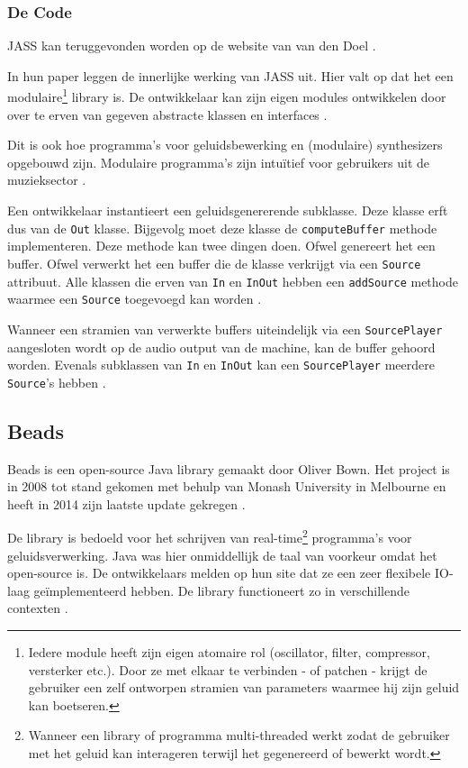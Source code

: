 \subsubsection*{De Code}
\label{sec:jass_code}

JASS kan teruggevonden worden op de website van van den Doel \autocite{jasscode}.

In hun paper leggen \textcite{jass} de innerlijke werking van JASS uit. Hier valt op dat het een modulaire\footnote{Iedere module heeft zijn eigen atomaire rol (oscillator, filter, compressor, versterker etc.). Door ze met elkaar te verbinden - of patchen - krijgt de gebruiker een zelf ontworpen stramien van parameters waarmee hij zijn geluid kan boetseren.} library is. De ontwikkelaar kan zijn eigen modules ontwikkelen door over te erven van gegeven abstracte klassen en interfaces  \autocite{jass}. 

Dit is ook hoe programma's voor geluidsbewerking en (modulaire) synthesizers opgebouwd zijn. Modulaire programma's zijn intuïtief voor gebruikers uit de muzieksector \autocite{bartvincent}.

Een ontwikkelaar instantieert een geluidsgenererende subklasse. Deze klasse erft dus van de \verb+Out+ klasse. Bijgevolg moet deze klasse de \verb+computeBuffer+ methode implementeren. Deze methode kan twee dingen doen. Ofwel genereert het een buffer. Ofwel verwerkt het een buffer die de klasse verkrijgt via een \verb+Source+ attribuut. Alle klassen die erven van \verb+In+ en \verb+InOut+ hebben een \verb+addSource+ methode waarmee een \verb+Source+ toegevoegd kan worden \autocite{jass}.

Wanneer een stramien van verwerkte buffers uiteindelijk via een \verb+SourcePlayer+ aangesloten wordt op de audio output van de machine, kan de buffer gehoord worden. Evenals subklassen van \verb+In+ en \verb+InOut+ kan een \verb+SourcePlayer+ meerdere \verb+Source+'s hebben \autocite{jass}.

\subsection{Beads}

Beads is een open-source Java library gemaakt door Oliver Bown. Het project is in 2008 tot stand gekomen met behulp van Monash University in Melbourne en heeft in 2014 zijn laatste update gekregen \autocite{beads}.

De library is bedoeld voor het schrijven van real-time\footnote{Wanneer een library of programma multi-threaded werkt zodat de gebruiker met het geluid kan interageren terwijl het gegenereerd of bewerkt wordt.} programma's voor geluidsverwerking. Java was hier onmiddellijk de taal van voorkeur omdat het open-source is. De ontwikkelaars melden op hun site dat ze een zeer flexibele IO-laag geïmplementeerd hebben. De library functioneert zo in verschillende contexten \autocite{beads}. 


